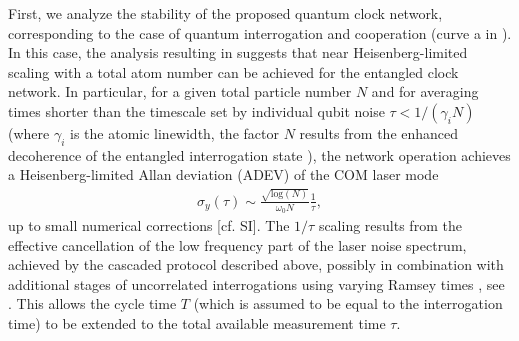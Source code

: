 First, we analyze the stability of the proposed quantum clock network,
corresponding to the case of quantum interrogation and cooperation (curve a in
). In this case, the analysis resulting in 
suggests that near Heisenberg-limited  scaling with a total atom number can be achieved
for the entangled clock network. 
In particular, for a given total particle number $N$ and for averaging times
shorter than the timescale set by individual qubit noise $\tau < 1/(\gamma_i N)$
(where $\gamma_i$ is the atomic linewidth, the factor $N$ results from the
enhanced decoherence of the entangled interrogation state
\cite{Huelga1997}), the network operation achieves a Heisenberg-limited Allan
deviation (ADEV) of the COM laser mode
\begin{align}
\label{eq:ADEV1}
 	\sigma_y(\tau) 
	\sim \frac{ \sqrt{\textrm{log}(N)}}{\omega_0 N} \frac{1}{\tau},
\end{align}
up to small numerical corrections [cf. SI].
The $1/\tau$ scaling results from the effective cancellation of the low
frequency part of the laser noise spectrum, achieved
by the cascaded protocol described above, possibly in combination with additional stages of uncorrelated interrogations using varying Ramsey times \cite{Rosenband2013,Borregaard2013}, see \cite{Kessler2014}.
This allows the cycle time $T$ (which is assumed to be equal to
the interrogation time) to be extended to the total available measurement time
$\tau$.
